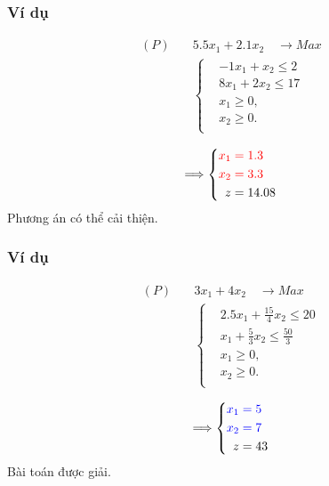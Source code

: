 \documentclass[12pt,a4paper]{report}
\begin{document}
\subsubsection*{Ví dụ}
        \begin{equation*}
        \begin{split}
            (P) \quad & 5.5x_1 + 2.1x_2 \quad \longrightarrow Max \\
            & \left\{\begin{split}
            & -1x_1 + x_2 \leq 2 \\
            & 8x_1 + 2x_2 \leq 17 \\
            &x_1 \geq 0, \\
            &x_2 \geq 0. \\
            \end{split}\right. \\
        \end{split}
        \end{equation*}
        \begin{equation*}
            \Longrightarrow
            \left\{\begin{split}
            \color{red} x_1 &\color{red} = 1.3 \\
            \color{red} x_2 &\color{red} = 3.3 \\
            z&=14.08
        \end{split}\right.
        \end{equation*}
    Phương án có thể cải thiện.



\subsubsection*{Ví dụ}
        \begin{equation*}
        \begin{split}
            (P) \quad & 3x_1 + 4x_2 \quad \longrightarrow Max \\
            & \left\{\begin{split}
            & 2.5x_1 + \frac{15}{4}x_2 \leq 20 \\
            & x_1 + \frac{5}{3}x_2 \leq \frac{50}{3} \\
            &x_1 \geq 0, \\
            &x_2 \geq 0. \\
            \end{split}\right. \\
        \end{split}
        \end{equation*}
        \begin{equation*}
            \Longrightarrow
            \left\{\begin{split}
            \color{blue} x_1 &\color{blue} = 5 \\
            \color{blue} x_2 &\color{blue} = 7 \\
            z& =43
        \end{split}\right.
        \end{equation*}
    Bài toán được giải.
\end{document}
